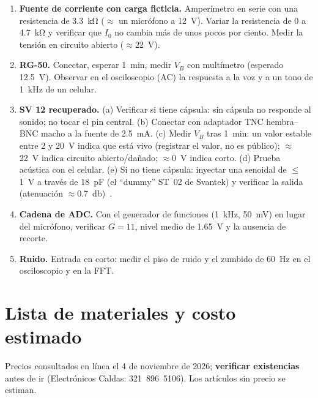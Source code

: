 \documentclass[11pt,a4paper]{article}
\begin{document}
\begin{enumerate}
  \item \textbf{Fuente de corriente con carga ficticia.} Amperímetro en serie con una resistencia de \SI{3.3}{\kilo\ohm} ($\approx$ un
        micrófono a \SI{12}{\volt}). Variar la resistencia de \SI{0}{} a \SI{4.7}{\kilo\ohm} y verificar que $I_0$ no cambia más
        de unos pocos por ciento. Medir la tensión en circuito abierto ($\approx$\SI{22}{\volt}).
  \item \textbf{RG-50.} Conectar, esperar \SI{1}{\minute}, medir $V_B$ con multímetro (esperado \SI{12.5}{\volt}). Observar en el
        osciloscopio (AC) la respuesta a la voz y a un tono de \SI{1}{\kilo\hertz} de un celular.
  \item \textbf{SV 12 recuperado.} (a) Verificar si tiene cápsula: sin cápsula no responde al sonido; no tocar el pin central.
        (b) Conectar con adaptador TNC hembra--BNC macho a la fuente de \SI{2.5}{\milli\ampere}. (c) Medir $V_B$ tras \SI{1}{\minute}:
        un valor estable entre \SI{2}{} y \SI{20}{\volt} indica que está vivo (registrar el valor, no es público);
        $\approx$\SI{22}{\volt} indica circuito abierto/dañado; $\approx$\SI{0}{\volt} indica corto. (d) Prueba acústica con
        el celular. (e) Si no tiene cápsula: inyectar una senoidal de $\leq$\SI{1}{\volt} a través de \SI{18}{\pico\farad}
        (el ``dummy'' ST~02 de Svantek) y verificar la salida (atenuación $\approx$\SI{0.7}{\decibel})~\cite{svan977w}.
  \item \textbf{Cadena de ADC.} Con el generador de funciones (\SI{1}{\kilo\hertz}, \SI{50}{\milli\volt}) en lugar del
        micrófono, verificar $G=11$, nivel medio de \SI{1.65}{\volt} y la ausencia de recorte.
  \item \textbf{Ruido.} Entrada en corto: medir el piso de ruido y el zumbido de \SI{60}{\hertz} en el osciloscopio y en la FFT.
\end{enumerate}

\section{Lista de materiales y costo estimado}

Precios consultados en línea el 4 de noviembre de 2026; \textbf{verificar existencias} antes de ir
(Electrónicos Caldas: 321~896~5106). Los artículos sin precio se estiman.
\end{document}
